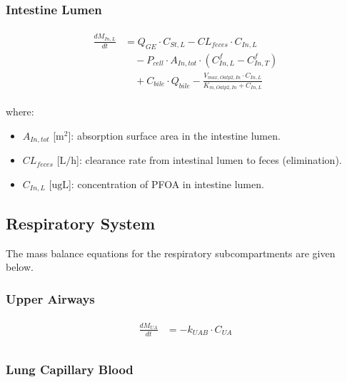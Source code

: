 \documentclass[preprint,12pt,authoryear]{elsarticle}
\begin{document}
\subsubsection{Intestine Lumen}

\begin{align}
\begin{aligned}
\frac{dM_{In,L}}{dt} &= Q_{GE} \cdot C_{St,L}
- CL_{feces} \cdot C_{In,L}\\
& \quad - P_{cell} \cdot A_{In,tot} \cdot (C_{In,L}^f - C_{In,T}^f)\\
& \quad + C_{bile} \cdot Q_{bile}
- \frac{V_{max,Oatp2,In} \cdot C_{In,L}}{K_{m,Oatp2,In} + C_{In,L}}
\end{aligned}
\label{eq:PFOA_intestine_lumen}
\end{align}

\noindent 
where:
\begin{itemize}
    \item $A_{In,tot}$ [$\text{m}^2$]: absorption surface area in the intestine lumen.
    \item $CL_{feces}$ [$\text{L}/\text{h}$]: clearance rate from intestinal lumen to feces (elimination).
    \item $C_{In,L}$ [$\text{ug}\text{L}$]: concentration of PFOA in intestine lumen.
\end{itemize}



\subsection{Respiratory System}

The mass balance equations for the respiratory subcompartments are given below.

\subsubsection{Upper Airways}
\begin{align}
\begin{aligned}
\frac{dM_{UA}}{dt} &=  - k_{UAB} \cdot C_{UA} \\
\end{aligned}
\label{eq:PFOA_Upper_Airways}
\end{align}


\subsubsection{Lung Capillary Blood}
\end{document}
